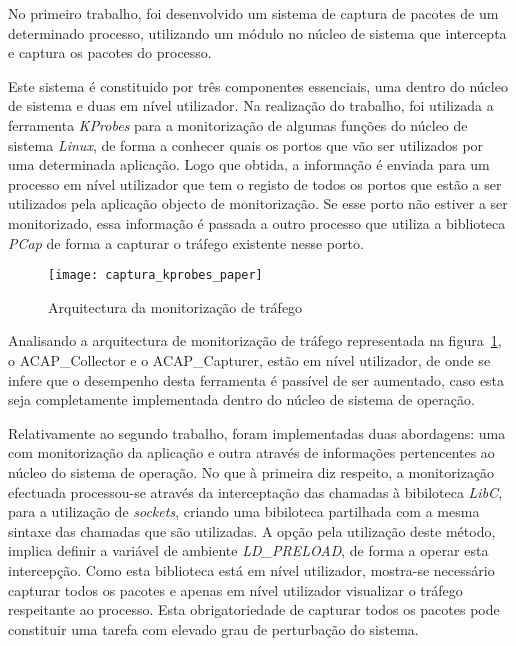 No primeiro trabalho, foi desenvolvido um sistema de captura de pacotes de um determinado processo, utilizando um módulo no núcleo de sistema que intercepta e captura os pacotes do processo.

Este sistema é constituido por três componentes essenciais, uma dentro do núcleo de sistema e duas em nível utilizador.
Na realização do trabalho, foi utilizada a ferramenta \textit{KProbes} para a monitorização de algumas funções do núcleo de sistema \textit{Linux}, de forma a conhecer quais os portos que vão ser utilizados por uma determinada aplicação.
Logo que obtida, a informação é enviada para um processo em nível utilizador que tem o registo de todos os portos que estão a ser utilizados pela aplicação objecto de monitorização.
Se esse porto não estiver a ser monitorizado, essa informação é passada a outro processo que utiliza a biblioteca \textit{PCap} de forma a capturar o tráfego existente nesse porto.


\begin{figure}[h!]
       \centering
       \texttt{[image: captura\_kprobes\_paper]}
       \caption{Arquitectura da monitorização de tráfego}
	\label{fig:paper_capture_kprobes}
\end{figure}


Analisando a arquitectura de monitorização de tráfego representada na figura~\ref{fig:paper_capture_kprobes}, o ACAP\_Collector e o ACAP\_Capturer, estão em nível utilizador, de onde se infere que o desempenho desta ferramenta é passível de ser aumentado, caso esta seja completamente implementada dentro do núcleo de sistema de operação.

Relativamente ao segundo trabalho, foram implementadas duas abordagens: uma com monitorização da aplicação e outra através de informações pertencentes ao núcleo do sistema de operação.
No que à primeira diz respeito, a monitorização efectuada processou-se através da interceptação das chamadas à bibiloteca \textit{LibC}, para a utilização de \textit{sockets}, criando uma bibiloteca partilhada com a mesma sintaxe das chamadas que são utilizadas.
A opção pela utilização deste método, implica definir a variável de ambiente \textit{LD\_PRELOAD}, de forma a operar esta intercepção.
Como esta biblioteca está em nível utilizador, mostra-se necessário capturar todos os pacotes e apenas em nível utilizador visualizar o tráfego respeitante ao processo.
Esta obrigatoriedade de capturar todos os pacotes pode constituir uma tarefa com elevado grau de perturbação do sistema.

